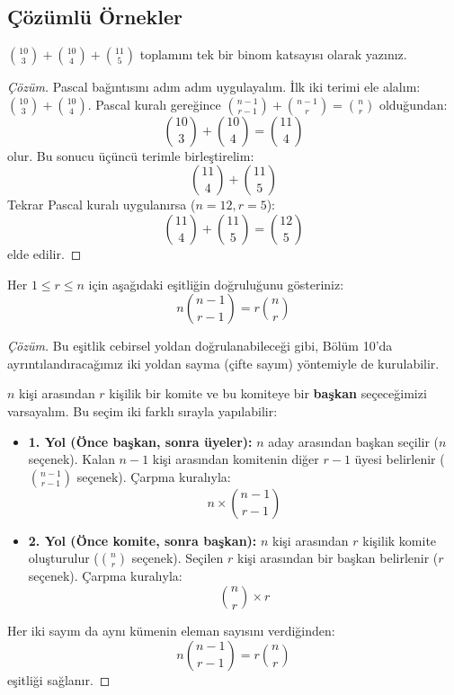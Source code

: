 \subsection{Çözümlü Örnekler}

\begin{example}
$\binom{10}{3} + \binom{10}{4} + \binom{11}{5}$ toplamını tek bir binom katsayısı olarak yazınız.
\end{example}
\begin{proof}[Çözüm]
Pascal bağıntısını adım adım uygulayalım.
İlk iki terimi ele alalım: $\binom{10}{3} + \binom{10}{4}$. 
Pascal kuralı gereğince $\binom{n-1}{r-1} + \binom{n-1}{r} = \binom{n}{r}$ olduğundan:
\[ \binom{10}{3} + \binom{10}{4} = \binom{11}{4} \]
olur. Bu sonucu üçüncü terimle birleştirelim:
\[ \binom{11}{4} + \binom{11}{5} \]
Tekrar Pascal kuralı uygulanırsa ($n = 12, r = 5$):
\[ \binom{11}{4} + \binom{11}{5} = \binom{12}{5} \]
elde edilir.
\end{proof}

\begin{example}
Her $1 \le r \le n$ için aşağıdaki eşitliğin doğruluğunu gösteriniz:
\[ n \binom{n - 1}{r - 1} = r \binom{n}{r} \]
\end{example}
\begin{proof}[Çözüm]
Bu eşitlik cebirsel yoldan doğrulanabileceği gibi, Bölüm 10'da ayrıntılandıracağımız iki yoldan sayma (çifte sayım) yöntemiyle de kurulabilir.

$n$ kişi arasından $r$ kişilik bir komite ve bu komiteye bir \textbf{başkan} seçeceğimizi varsayalım. Bu seçim iki farklı sırayla yapılabilir:

\begin{itemize}
  \item \textbf{1. Yol (Önce başkan, sonra üyeler):}
  $n$ aday arasından başkan seçilir ($n$ seçenek).
  Kalan $n - 1$ kişi arasından komitenin diğer $r - 1$ üyesi belirlenir ($\binom{n-1}{r-1}$ seçenek).
  Çarpma kuralıyla:
  \[ n \times \binom{n-1}{r-1} \]
  
  \item \textbf{2. Yol (Önce komite, sonra başkan):}
  $n$ kişi arasından $r$ kişilik komite oluşturulur ($\binom{n}{r}$ seçenek).
  Seçilen $r$ kişi arasından bir başkan belirlenir ($r$ seçenek).
  Çarpma kuralıyla:
  \[ \binom{n}{r} \times r \]
\end{itemize}
Her iki sayım da aynı kümenin eleman sayısını verdiğinden:
\[ n \binom{n - 1}{r - 1} = r \binom{n}{r} \]
eşitliği sağlanır.
\end{proof}

